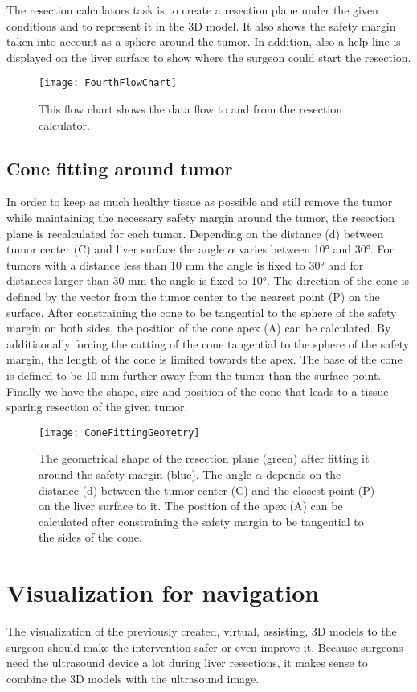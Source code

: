The resection calculators task is to create a resection plane under the given
conditions and to represent it in the 3D model. It also shows the safety margin taken
into account as a sphere around the tumor. In addition, also a help line is displayed
on the liver surface to show where the surgeon could start the resection.
\begin{figure}[H]
  \centering
 \texttt{[image: FourthFlowChart]}
  \caption{This flow chart shows the data flow to and from the resection calculator.}
  \label{fig:FourthFlowChart}
\end{figure}

\subsection{Cone fitting around tumor}
In order to keep as much healthy tissue as possible and still remove the tumor
while maintaining the necessary safety margin around the tumor, the resection
plane is recalculated for each tumor. Depending on the distance (d) between tumor
center (C) and liver surface the angle $\alpha$ varies between 10° and 30°. For
tumors with a distance less than 10 mm the angle is fixed to 30° and for
distances larger than 30 mm the angle is fixed to 10°. The direction of the cone
is defined by the vector from the tumor center to the nearest point (P) on the
surface. After constraining the cone to be tangential to the sphere of the
safety margin on both sides, the position of the cone apex (A) can be calculated. By
additiaonally forcing the cutting of the cone tangential to the sphere of the
safety margin, the length of the cone is limited towards the apex. The base of
the cone is defined to be 10 mm further away from the tumor than the surface
point. Finally we have the shape, size and position of the cone that leads to a
tissue sparing resection of the given tumor.
\begin{figure}[H]
  \centering
 \texttt{[image: ConeFittingGeometry]}
  \caption{The geometrical shape of the resection plane (green) after fitting it
  around the safety margin (blue). The angle $\alpha$ depends on the distance (d)
  between the tumor center (C) and the closest point (P) on the liver surface to
  it. The position of the apex (A) can be calculated after constraining the
  safety margin to be tangential to the sides of the cone.}
  \label{fig:ConeFittingGeometry}
\end{figure}

\section{Visualization for navigation}
The visualization of the
previously created, virtual, assisting, 3D models to the surgeon should make the intervention
safer or even improve it.
Because surgeons need the ultrasound device a lot during liver resections, it
makes sense to combine the 3D models with the ultrasound image.
